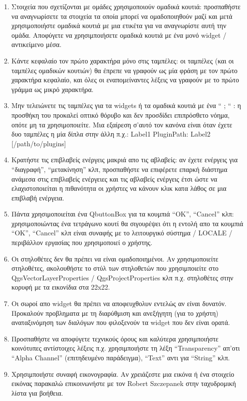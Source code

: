  \begin{enumerate}
 \item Στοιχεία που σχετίζονται με ομάδες χρησιμοποιούν ομαδικά κουτιά: προσπαθήστε να αναγνωρίσετε τα στοιχεία τα οποία μπορεί να ομαδοποιηθούν μαζί και μετά χρησιμοποιήστε ομαδικά κουτιά με μια ετικέτα για να αναγνωρίστε αυτή την ομάδα. Αποφύγετε να χρησιμποιήσετε ομαδικά κουτιά με ένα μονό widget / αντικείμενο μέσα.
 \item  Κάντε κεφαλαίο τον πρώτο χαρακτήρα μόνο στις ταμπέλες: οι ταμπέλες (και οι ταμπέλες ομαδικών κουτιών) θα έπρεπε να γραφούν ως μία φράση με τον πρώτο χαρακτήρα κεφαλαίο, και όλες οι εναπομείναντες λέξεις να γραφούν με το πρώτο γράμμα ως μικρό χαρακτήρα. 
 \item Μην τελειώνετε τις ταμπέλες για τα widgets ή τα ομαδικά κουτιά με ένα “ ; “ : η προσθήκη του προκαλεί οπτικό θόρυβο και δεν προσδίδει επιπρόσθετο νόημα, οπότε μη τα χρησιμοποιείτε. Μια εξαίρεση σ'αυτό τον κανόνα είναι όταν έχετε δυο ταμπέλες η μία δίπλα στην άλλη π.χ.: Label1 {Plugin}{Path:} Label2 [/path/to/plugins]
 \item Κρατήστε τις επιβλαβείς ενέργεις μακριά απο τις αβλαβείς: αν έχετε ενέργεις για “διαγραφή”, “μετακίνηση” κλπ, προσπαθήστε να επιφέρετε επαρκή διάστημα ανάμεσα στις επιβλαβείς ενέργειες και τις αβλαβείς ενέργεις έτσι ώστε να ελαχιστοποιείται η πιθανότητα οι χρήστες να κάνουν κλικ κατα λάθος σε μια επιβλαβή ενέργεια.
 \item Πάντα χρησιμοποιείται ένα QbuttonBox
 για τα κουμπιά “ΟΚ”, “Cancel” κλπ: χρησιμοποιώντας ένα τετράγωνο κουτί θα σιγουρέψει ότι η εντολή απο τα κουμπιά “OK”, “Cancel” κλπ είναι συναφής με το λειτουργικό σύστημα / LOCALE / περιβάλλον εργασίας που χρησιμοποιεί ο χρήστης.
 \item Οι στηλοθέτες δεν θα πρέπει να είναι ομαδοποιημένοι. Αν χρησιμοποιείτε στηλοθέτες, ακολουθήστε το στύλ των στηλοθετών που χρησιμποιείτε στο QgsVectorLayerProperties / QgsProjectProperties
 κλπ π.χ. στηλοθέτες στην κορυφή με τα εικονίδια στα 22x22.
 \item Οι σωροί απο widget θα πρέπει να αποφευχθολυν εντελώς αν είναι δυνατόν. Προκαλούν προβληματα με τη διαρύθμιση και ανεξήγητη (για το χρήστη) αναταξινόμηση των διαλόγων που φιλοξενούν τα widget που δεν είναι ορατά.
 \item Προσπαθήστε να αποφύγετε τεχνικούς όρους και καλύτερα χρησιμποιήστε κοινότυπες αντίστοιχες λέξεις π.χ. χρησιμποιήστε τη λέξη “Transparency” απ'οτι “Alpha Channel” (επιτηδευμένο παράδειγμα), “Text” αντι για “String” κλπ.
 \item Χρησιμποιήστε συναφή εικονογραφία. Αν χρειάζεστε μια εικόνα ή ένα στοιχείο εικόνας παρακαλώ επικοινωνήστε με τον Robert Szczepanek στην ταχυδρομική λίστα για βοήθεια.

\end{enumerate}
